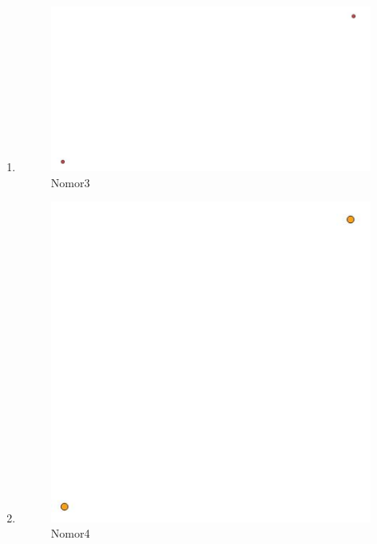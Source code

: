\begin{enumerate}
			\item 
				
				\begin{figure}[H]
					\includegraphics[width=12cm]{figures/1174043/3.jpg}
					\centering
					\caption{Nomor3}
				\end{figure}
			
			\item 
				
				\begin{figure}[H]
					\includegraphics[width=12cm]{figures/1174043/4.jpg}
					\centering
					\caption{Nomor4}
				\end{figure}
			

\end{enumerate}
